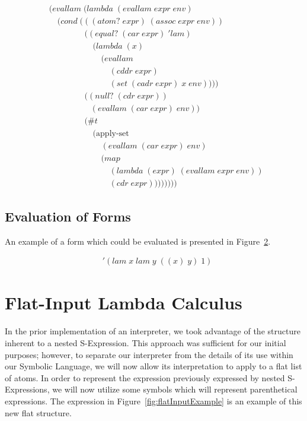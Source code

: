 \begin{figure}[htp]
\footnotesize
\caption{}\label{fig:evallamDef}
\begin{align*}
& (evallam \; (lambda \; (evallam \; expr \; env)
\\& \quad (cond \; (((atom? \; expr) \; (assoc \; expr \; env))
\\& \qquad \qquad \; ((equal? \; (car \; expr) \; 'lam) \; 
\\& \qquad \qquad \quad \; (lambda \; (x) \; 
\\& \qquad \qquad \qquad \; (evallam \; 
\\& \qquad \qquad \qquad \quad \; (cddr \; expr) \; 
\\& \qquad \qquad \qquad \quad \; (set \; (cadr \; expr) \; x \; env))))
\\& \qquad \qquad \; ((null? \; (cdr \; expr)) \; 
\\& \qquad \qquad \quad (evallam \; (car \; expr) \; env))
\\& \qquad \qquad \; (\#t \; 
\\& \qquad \qquad \quad \; (\text{apply-set} \; 
\\& \qquad \qquad \qquad \; (evallam \; (car \; expr) \; env) \; 
\\& \qquad \qquad \qquad \; (map \; 
\\& \qquad \qquad \qquad \quad \; (lambda \; (expr) \; (evallam \; expr \; env)) \; 
\\& \qquad \qquad \qquad \quad \; (cdr \; expr))))))))
\end{align*}
\end{figure}

\subsection{Evaluation of Forms}
An example of a form which could be evaluated is presented in Figure~\ref{fig:evalFormExample}. 

\begin{figure}[htp]
\footnotesize
\caption{}\label{fig:evalFormExample}
\begin{align*}
& '(lam \; x \; lam \; y \; ((x) \; y) \; 1)
\end{align*}
\end{figure}

\section{Flat-Input Lambda Calculus }
In the prior implementation of an interpreter, we took advantage of the
structure inherent to a nested S-Expression. This approach was sufficient for
our initial purposes; however, to separate our interpreter from the details of
its use within our Symbolic Language, we will now allow its interpretation to
apply to a flat list of atoms.  In order to represent the expression previously
expressed by nested S-Expressions, we will now utilize some symbols which will
represent parenthetical expressions.  The expression in
Figure~\ref{fig:flatInputExample} is an example of this new flat structure.

